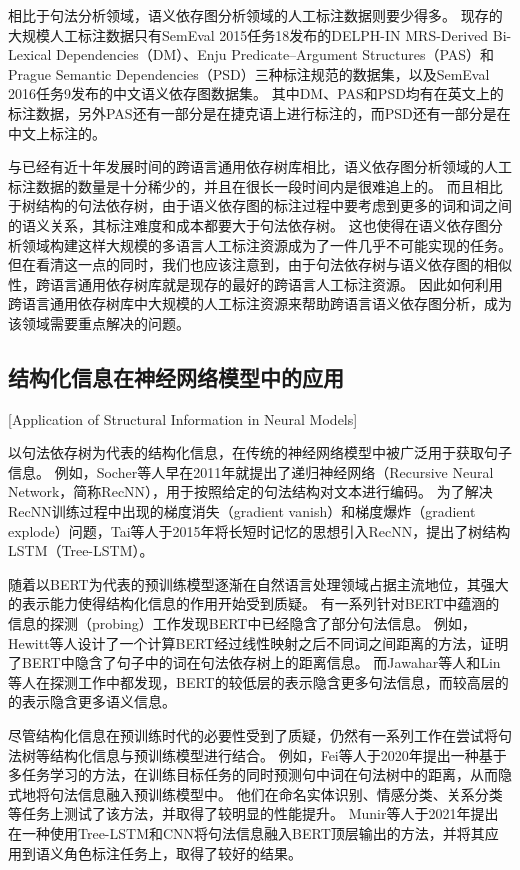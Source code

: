 相比于句法分析领域，语义依存图分析领域的人工标注数据则要少得多。
现存的大规模人工标注数据只有SemEval 2015任务18\cite{oepen-etal-2015-semeval}发布的DELPH-IN MRS-Derived Bi-Lexical Dependencies（DM）、Enju Predicate–Argument Structures（PAS）和Prague Semantic Dependencies（PSD）三种标注规范的数据集，以及SemEval 2016任务9\cite{che-etal-2016-semeval}发布的中文语义依存图数据集。
其中DM、PAS和PSD均有在英文上的标注数据，另外PAS还有一部分是在捷克语上进行标注的，而PSD还有一部分是在中文上标注的。

与已经有近十年发展时间的跨语言通用依存树库相比，语义依存图分析领域的人工标注数据的数量是十分稀少的，并且在很长一段时间内是很难追上的。
而且相比于树结构的句法依存树，由于语义依存图的标注过程中要考虑到更多的词和词之间的语义关系，其标注难度和成本都要大于句法依存树。
这也使得在语义依存图分析领域构建这样大规模的多语言人工标注资源成为了一件几乎不可能实现的任务。
但在看清这一点的同时，我们也应该注意到，由于句法依存树与语义依存图的相似性，跨语言通用依存树库就是现存的最好的跨语言人工标注资源。
因此如何利用跨语言通用依存树库中大规模的人工标注资源来帮助跨语言语义依存图分析，成为该领域需要重点解决的问题。

\subsection{结构化信息在神经网络模型中的应用}[Application of Structural Information in Neural Models]

以句法依存树为代表的结构化信息，在传统的神经网络模型中被广泛用于获取句子信息。
例如，Socher等人早在2011年就提出了递归神经网络（Recursive Neural Network，简称RecNN）\cite{socher-etal-2011-parsing}，用于按照给定的句法结构对文本进行编码。
为了解决RecNN训练过程中出现的梯度消失（gradient vanish）和梯度爆炸（gradient explode）问题\cite{bengio-etal-1994-learning}，Tai等人于2015年将长短时记忆的思想引入RecNN，提出了树结构LSTM（Tree-LSTM）\cite{tai-etal-2015-improved}。

随着以BERT为代表的预训练模型逐渐在自然语言处理领域占据主流地位，其强大的表示能力使得结构化信息的作用开始受到质疑。
有一系列针对BERT中蕴涵的信息的探测（probing）工作发现BERT中已经隐含了部分句法信息。
例如，Hewitt等人\cite{hewitt-manning-2019-structural}设计了一个计算BERT经过线性映射之后不同词之间距离的方法，证明了BERT中隐含了句子中的词在句法依存树上的距离信息。
而Jawahar等人\cite{jawahar-etal-2019-bert}和Lin等人\cite{lin-etal-2019-open}在探测工作中都发现，BERT的较低层的表示隐含更多句法信息，而较高层的的表示隐含更多语义信息。

尽管结构化信息在预训练时代的必要性受到了质疑，仍然有一系列工作在尝试将句法树等结构化信息与预训练模型进行结合。
例如，Fei等人\cite{fei-etal-2020-retrofitting}于2020年提出一种基于多任务学习的方法，在训练目标任务的同时预测句中词在句法树中的距离，从而隐式地将句法信息融入预训练模型中。
他们在命名实体识别、情感分类、关系分类等任务上测试了该方法，并取得了较明显的性能提升。
Munir等人\cite{munir-etal-2021-adaptive}于2021年提出在一种使用Tree-LSTM和CNN将句法信息融入BERT顶层输出的方法，并将其应用到语义角色标注任务上，取得了较好的结果。


